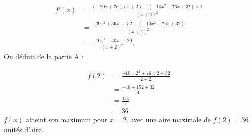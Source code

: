 \documentclass[10pt]{article}
\begin{document}
\begin{align*}
f'(x) &= \frac{(-20x + 76)(x + 2) - (-10x^2 + 76x + 32) \times 1}{(x + 2)^2} \\
&= \frac{-20x^2 + 36x + 152 - (-10x^2 + 76x + 32)}{(x + 2)^2} \\
&= \frac{-10x^2 - 40x + 120}{(x + 2)^2}.
\end{align*}
On déduit de la partie A :
\begin{center}
\end{center}
\begin{align*}
f(2) &= \frac{-10 \times 2^2 + 76 \times 2 + 32}{2 + 2} \\
&= \frac{-40 + 152 + 32}{4} \\
&= \frac{144}{4} \\
&= 36.
\end{align*}
\( f(x) \) atteint son maximum pour \( x = 2 \), avec une aire maximale de \( f(2) = 36 \) unités d'aire.
\end{document}
